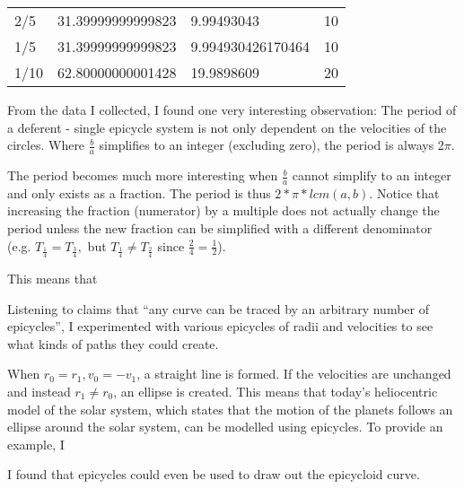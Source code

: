 \begin{table}[H]
\begin{tabular}{llll}
2/5                                 & 31.39999999999823                       & 9.99493043                              & 10                                         \\
1/5                                 & 31.39999999999823                       & 9.994930426170464                       & 10                                         \\
1/10                                & 62.80000000001428                       & 19.9898609                              & 20                                        
\end{tabular}
\end{table}


From the data I collected, I found one very interesting observation: The period of a deferent - single epicycle system is not only dependent on the velocities of the circles. Where $\frac{b}{a}$ simplifies to an integer (excluding zero), the period is always 2$\pi$.

The period becomes much more interesting when $\frac{b}{a}$ cannot simplify to an integer and only exists as a fraction. The period is thus $2*\pi*lcm(a, b)$. Notice that increasing the fraction (numerator) by a multiple does not actually change the period unless the new fraction can be simplified with a different denominator (e.g. $T_{\frac{1}{4}} = T_{\frac{3}{4}}, $ but $  T_{\frac{1}{4}} \neq T_{\frac{2}{4}} $ since $ \frac{2}{4} = \frac{1}{2} $). 

This means that 


Listening to claims that ``any curve can be traced by an arbitrary number of epicycles'', I experimented with various epicycles of radii and velocities to see what kinds of paths they could create. 

When $r_{0} = r_{1}, v_{0} = -v_{1}$, a straight line is formed. If the velocities are unchanged and instead $r_{1} \neq r_{0}$, an ellipse is created. This means that today's heliocentric model of the solar system, which states that the motion of the planets follows an ellipse around the solar system, can be modelled using epicycles. To provide an example, I 

I found that epicycles could even be used to draw out the epicycloid curve.




